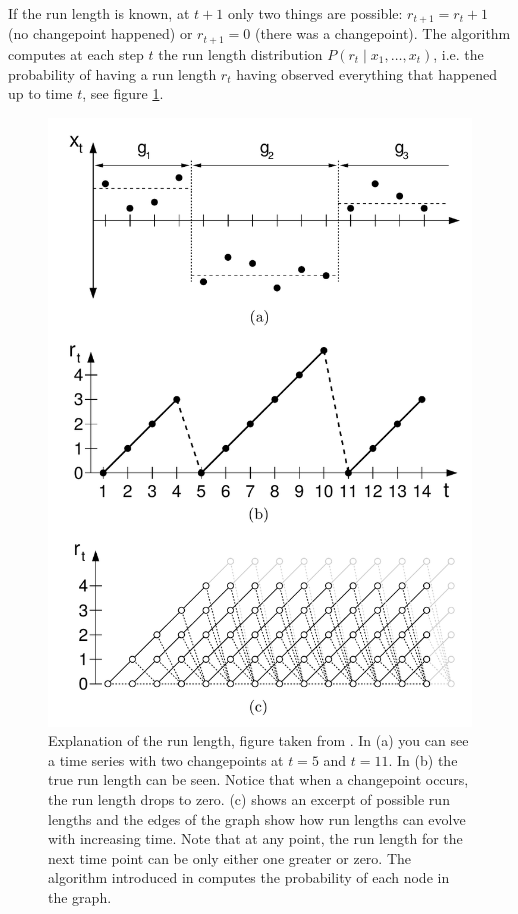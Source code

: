 \documentclass[12pt,a4paper]{article}
\begin{document}
If the run length is known, at $t+1$ only two things are possible: $r_{t+1}=r_t + 1$ (no changepoint happened) or $r_{t+1}=0$ (there was a changepoint). The algorithm computes at each step $t$ the run length distribution $P(r_t \mid x_1,\dots,x_t)$, i.e. the probability of having a run length $r_t$ having observed everything that happened up to time $t$, see figure \ref{fig:runlength_example}.

\begin{figure}
	\centering
	\includegraphics{images/runlength_example.png}
	\caption{Explanation of the run length, figure taken from \cite{Adams:BayesianOnlineChangepoint}. In (a) you can see a time series with two changepoints at $t=5$ and $t=11$. In (b) the true run length can be seen. Notice that when a changepoint occurs, the run length drops to zero. (c) shows an excerpt of possible run lengths and the edges of the graph show how run lengths can evolve with increasing time. Note that at any point, the run length for the next time point can be only either one greater or zero. The algorithm introduced in \cite{Adams:BayesianOnlineChangepoint} computes the probability of each node in the graph.}
	\label{fig:runlength_example}
\end{figure}
\end{document}
